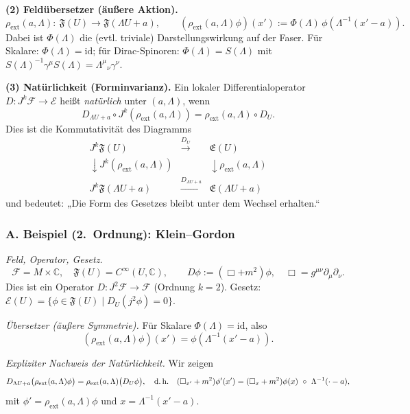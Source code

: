 \documentclass[10pt, letterpaper]{article}
\newcommand{\C}{\mathbb{C}}
\begin{document}
\textbf{(2) Feldübersetzer (äußere Aktion).} 
\[
\rho_{\mathrm{ext}}(a,\Lambda):\ \mathfrak F(U)\longrightarrow \mathfrak F(\Lambda U + a),
\qquad
(\rho_{\mathrm{ext}}(a,\Lambda)\phi)(x') := \Phi(\Lambda)\,\phi(\Lambda^{-1}(x'-a)).
\]
Dabei ist $\Phi(\Lambda)$ die (evtl. triviale) Darstellungswirkung auf der Faser.
Für Skalare: $\Phi(\Lambda)=\mathrm{id}$;
für Dirac-Spinoren: $\Phi(\Lambda)=S(\Lambda)$ mit $S(\Lambda)^{-1}\gamma^\mu S(\Lambda)=\Lambda^\mu{}_\nu\gamma^\nu$.

\textbf{(3) Natürlichkeit (Forminvarianz).}
Ein lokaler Differentialoperator $D:J^k\mathcal F\to\mathcal E$ heißt \emph{natürlich}
unter $(a,\Lambda)$, wenn
\[
D_{\Lambda U + a}\circ J^k(\rho_{\mathrm{ext}}(a,\Lambda))
=\rho_{\mathrm{ext}}(a,\Lambda)\circ D_U.
\]
Dies ist die Kommutativität des Diagramms
\[
\begin{array}{ccc}
J^k\mathfrak F(U) & \xrightarrow{D_U} & \mathfrak E(U)\\
\downarrow J^k(\rho_{\mathrm{ext}}(a,\Lambda)) & & \downarrow \rho_{\mathrm{ext}}(a,\Lambda)\\
J^k\mathfrak F(\Lambda U + a) & \xrightarrow{D_{\Lambda U+a}} & \mathfrak E(\Lambda U+a)
\end{array}
\]
und bedeutet: „Die Form des Gesetzes bleibt unter dem Wechsel erhalten.“

\bigskip
\subsubsection*{A. Beispiel (2.\ Ordnung): Klein–Gordon}

\emph{Feld, Operator, Gesetz.}
\[
\mathcal F=M\times\C,\quad \mathfrak F(U)=C^\infty(U,\C),
\qquad
D\phi := (\Box + m^2)\phi,
\quad \Box = g^{\mu\nu}\partial_\mu\partial_\nu.
\]
Dies ist ein Operator $D:J^2\mathcal F\to \mathcal F$ (Ordnung $k=2$).
Gesetz: $\mathcal E(U)=\{\phi\in\mathfrak F(U)\mid D_U(j^2\phi)=0\}$.

\emph{Übersetzer (äußere Symmetrie).} Für Skalare $\Phi(\Lambda)=\mathrm{id}$,
also
\[
(\rho_{\mathrm{ext}}(a,\Lambda)\phi)(x')=\phi(\Lambda^{-1}(x'-a)).
\]

\emph{Expliziter Nachweis der Natürlichkeit.}
Wir zeigen
\[
D_{\Lambda U+a}\big(\rho_{\mathrm{ext}}(a,\Lambda)\phi\big)
=\rho_{\mathrm{ext}}(a,\Lambda)\big(D_U\phi\big),
\quad\text{d.\,h.}\quad
(\Box_{x'}+m^2)\phi'(x') = (\Box_x+m^2)\phi(x)\ \circ\ \Lambda^{-1}(\cdot-a),
\]
mit $\phi'=\rho_{\mathrm{ext}}(a,\Lambda)\phi$ und $x=\Lambda^{-1}(x'-a)$.
\end{document}
